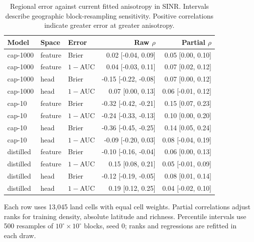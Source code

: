 \begin{table}[htbp]\centering\small
\caption{Regional error against current fitted anisotropy in SINR. Intervals describe geographic block-resampling sensitivity. Positive correlations indicate greater error at greater anisotropy.}
\label{tab:downfull}
\begin{tabular}{@{}lllrr@{}}\toprule
Model&Space&Error&Raw $\rho$&Partial $\rho$\\\midrule
cap-1000&feature&Brier&0.02 [-0.04, 0.09]&0.05 [0.00, 0.10]\\
cap-1000&feature&$1-$AUC&0.04 [-0.03, 0.11]&0.07 [0.02, 0.12]\\
cap-1000&head&Brier&-0.15 [-0.22, -0.08]&0.07 [0.00, 0.12]\\
cap-1000&head&$1-$AUC&0.07 [0.00, 0.13]&0.06 [-0.01, 0.12]\\
cap-10&feature&Brier&-0.32 [-0.42, -0.21]&0.15 [0.07, 0.23]\\
cap-10&feature&$1-$AUC&-0.24 [-0.33, -0.13]&0.10 [0.00, 0.20]\\
cap-10&head&Brier&-0.36 [-0.45, -0.25]&0.14 [0.05, 0.24]\\
cap-10&head&$1-$AUC&-0.09 [-0.20, 0.03]&0.08 [-0.04, 0.19]\\
distilled&feature&Brier&-0.10 [-0.16, -0.04]&0.06 [0.00, 0.13]\\
distilled&feature&$1-$AUC&0.15 [0.08, 0.21]&0.05 [-0.01, 0.09]\\
distilled&head&Brier&-0.12 [-0.19, -0.05]&0.08 [0.01, 0.14]\\
distilled&head&$1-$AUC&0.19 [0.12, 0.25]&0.04 [-0.02, 0.10]\\
\bottomrule\end{tabular}
\par\smallskip\parbox{.97\textwidth}{\footnotesize Each row uses 13,045 land cells with equal cell weights. Partial correlations adjust ranks for training density, absolute latitude and richness. Percentile intervals use 500 resamples of $10^\circ\times10^\circ$ blocks, seed 0; ranks and regressions are refitted in each draw.}
\end{table}
